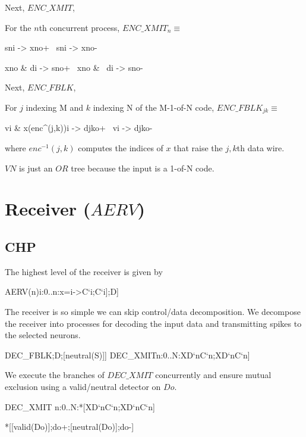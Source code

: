 \documentclass{article}
\begin{document}
Next, $ENC\_XMIT$,

For the $n$th concurrent process, $ENC\_XMIT_n\equiv$
\begin{prs2}
sni -> xno+
~sni -> xno-

xno & di -> sno+
~xno & ~di -> sno-
\end{prs2}

Next, $ENC\_FBLK$,

For $j$ indexing M and $k$ indexing N of the M-1-of-N code, $ENC\_FBLK_{jk}\equiv$
\begin{prs2}
vi & x(enc^{}(j,k))i -> djko+
~vi -> djko-
\end{prs2}

\noindent where $enc^{-1}(j,k)$ computes the indices of $x$ that raise the $j,k$th data wire.

$VN$ is just an $OR$ tree because the input is a 1-of-N code.

\section{Receiver ($AERV$)}

\subsection{CHP}

The highest level of the receiver is given by

\begin{csp}
AERV(n)\equiv*[dec(D)?x;[\langle[]i:0..n:x=i->C`i;C`i];D]
\end{csp}

The receiver is so simple we can skip control/data decomposition.
We decompose the receiver into processes for decoding the input data and transmitting spikes to the selected neurons.

\begin{csp}
DEC_FBLK\equiv*[dec(D)?S;[valid(S)];D;[neutral(S)]]
DEC_XMIT\equiv*[\langle[]n:0..N:XD`n\star\!C`n;XD`n\star\!C`n\rangle]
\end{csp}

We execute the branches of $DEC\_XMIT$ concurrently and ensure mutual exclusion using a valid/neutral detector on $Do$.

\begin{csp}
DEC_XMIT\equiv
\langle\pll\!n:0..N:*[XD`n\star\!C`n;XD`n\star\!C`n]\rangle

*[[valid(Do)];do+;[neutral(Do)];do-]
\end{csp}
\end{document}
